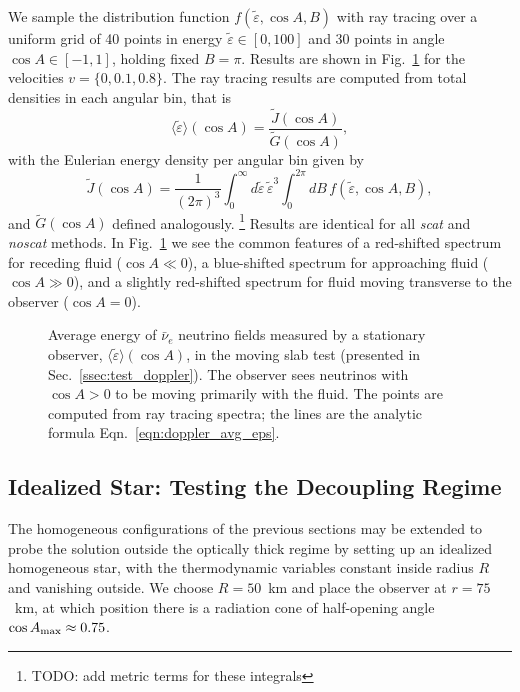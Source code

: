 \documentclass[aps,floatfix,prd,superscriptaddress,twocolumn]{revtex4-1}
\begin{document}
We sample the distribution function $f(\tilde{\varepsilon},\cos A,B)$
with ray tracing
over a uniform grid of 40 points in energy $\tilde{\varepsilon}\in[0,100]$
and 30 points in angle $\cos A\in[-1,1]$, holding fixed $B=\pi$.
Results are shown in Fig.~\ref{fig:avg_eps_doppler} for
the velocities $v=\{0,0.1,0.8\}$.
The ray tracing results are computed from total densities in each angular bin,
that is
\begin{equation}
  \label{eqn:avg_eps_per_cosA}
  \langle \tilde{\varepsilon} \rangle (\cos A) =
  \frac{\tilde{J}(\cos A)}{\tilde{G}(\cos A)},
\end{equation}
with the Eulerian energy density per angular bin given by
\begin{equation}
  \label{eqn:J_per_cosA}
  \tilde{J}(\cos A) =
  \frac{1}{(2\pi)^3} \int_0^{\infty} d\tilde{\varepsilon} \, \tilde{\varepsilon}^3
  \int_0^{2\pi} dB \, f(\tilde{\varepsilon},\cos A,B),
\end{equation}
and $\tilde{G}(\cos A)$ defined analogously.
\footnote{TODO: add metric terms for these integrals}
Results are identical for all \emph{scat} and \emph{noscat} methods.
In Fig.~\ref{fig:avg_eps_doppler}
we see the common features of a red-shifted spectrum for receding fluid
($\cos A\ll0$),
a blue-shifted spectrum for approaching fluid
($\cos A\gg0$),
and a slightly red-shifted spectrum for fluid moving transverse to the
observer ($\cos A=0$).

\begin{figure}
  \resizebox{\columnwidth}{!}{}
  \caption{Average energy of $\bar{\nu}_e$ neutrino fields
    measured by a stationary observer,
    $\langle\tilde{\varepsilon}\rangle(\cos A)$,
    in the moving slab test (presented in Sec.~\ref{ssec:test_doppler}).
    The observer sees neutrinos with $\cos A>0$ to be moving primarily with
    the fluid.
    The points are computed from ray tracing spectra; the lines are the
    analytic formula Eqn.~\ref{eqn:doppler_avg_eps}.
  }
  \label{fig:avg_eps_doppler}
\end{figure}

\subsection{Idealized Star:
  Testing the Decoupling Regime}
\label{ssec:test_ab_star}
The homogeneous configurations of the previous sections may be extended to
probe the solution outside the optically thick regime
by setting up an idealized homogeneous star, with the thermodynamic variables
constant inside radius $R$ and vanishing outside.
We choose $R=50$~km and place the observer at $r=75$~km,
at which position there is a radiation cone of half-opening angle
$\cos A_{\rm max}\approx0.75$.
\end{document}
